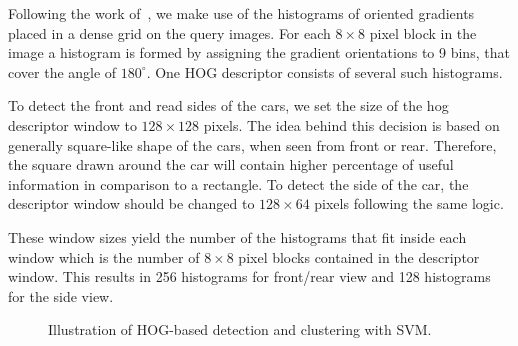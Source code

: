 Following the work of~\citet{dalal2005}, we make use of the histograms of
oriented gradients placed in a dense grid on the query images. For each $8
\times 8$ pixel block in the image a histogram is formed by assigning the
gradient orientations to 9 bins, that cover the angle of $180^{\circ}$. One
HOG descriptor consists of several such histograms.

To detect the front and read sides of the cars, we set the size of the hog
descriptor window to $128 \times 128$ pixels. The idea behind this decision is
based on generally square-like shape of the cars, when seen from front or
rear. Therefore, the square drawn around the car will contain higher
percentage of useful information in comparison to a rectangle. To detect the
side of the car, the descriptor window should be changed to $128 \times 64$
pixels following the same logic.

These window sizes yield the number of the histograms that fit inside each
window which is the number of $8 \times 8$ pixel blocks contained in the
descriptor window. This results in 256 histograms for front/rear view and 128
histograms for the side view.

\begin{figure}[t]%
\centering
{}
\caption{Illustration of HOG-based detection and clustering with SVM.}
\label{fig:det_to_svm}
\end{figure}

